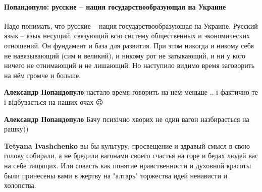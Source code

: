  
 
 
 
 
\paragraph{Попандопуло: русские – нация государствообразующая на Украине}

\begin{itemize}


Надо понимать, что русские – нация государствообразующая на Украине. Русский
язык – язык несущий, связующий всю систему общественных и экономических
отношений. Он фундамент и база для развития. При этом никогда и никому себя не
навязывающий (сим и великий), и никому рот не затыкающий, и ни у кого ничего не
отнимающий и не лишающий. Но наступило видимо время заговорить на нём громче и
больше.
	
\begin{itemize}

\textbf{Александр Попандопуло} настало время говорить на нем меньше .. і
фактично те і відбувається на наших очах 😉



\textbf{Александр Попандопуло} Бачу психічно хворих не один вагон назбирається
на рашку))



\textbf{Tetyana Ivashchenko} вы бы культуру, просвещение и здравый смысл в свою
голову собирали, а не бредили вагонами своего счастья на горе и бедах людей вас
на себе тащящих. Или совесть как понятие нравственности и духовной красоты были
принесены вами в жертву на "алтарь" торжества идей ненависти и холопства.




\end{itemize}
\end{itemize}
